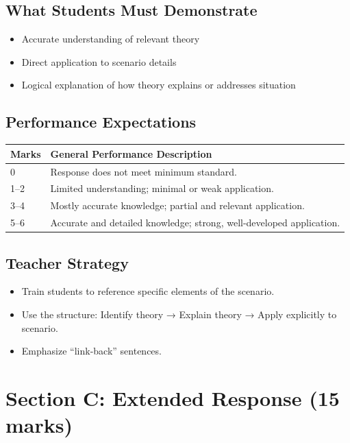 \documentclass[12pt,a4paper]{article}
\begin{document}
\subsection*{What Students Must Demonstrate}
\begin{itemize}
    \item Accurate understanding of relevant theory
    \item Direct application to scenario details
    \item Logical explanation of how theory explains or addresses situation
\end{itemize}

\subsection*{Performance Expectations}

\begin{longtable}{p{1.5cm} p{12cm}}
\toprule
\textbf{Marks} & \textbf{General Performance Description} \\
\midrule
0 & Response does not meet minimum standard. \\
1--2 & Limited understanding; minimal or weak application. \\
3--4 & Mostly accurate knowledge; partial and relevant application. \\
5--6 & Accurate and detailed knowledge; strong, well-developed application. \\
\bottomrule
\end{longtable}

\subsection*{Teacher Strategy}
\begin{itemize}
    \item Train students to reference specific elements of the scenario.
    \item Use the structure: Identify theory → Explain theory → Apply explicitly to scenario.
    \item Emphasize “link-back” sentences.
\end{itemize}

\newpage

\section{Section C: Extended Response (15 marks)}
\end{document}
